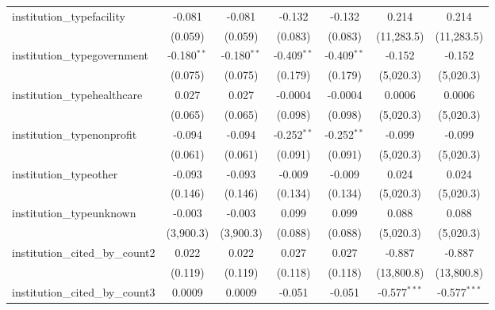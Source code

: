 \begin{tabular}{lcccccc}
   institution\_typefacility             & -0.081         & -0.081         & -0.132        & -0.132        & 0.214          & 0.214\\   
                                         & (0.059)        & (0.059)        & (0.083)       & (0.083)       & (11,283.5)     & (11,283.5)\\   
   institution\_typegovernment           & -0.180$^{**}$  & -0.180$^{**}$  & -0.409$^{**}$ & -0.409$^{**}$ & -0.152         & -0.152\\   
                                         & (0.075)        & (0.075)        & (0.179)       & (0.179)       & (5,020.3)      & (5,020.3)\\   
   institution\_typehealthcare           & 0.027          & 0.027          & -0.0004       & -0.0004       & 0.0006         & 0.0006\\   
                                         & (0.065)        & (0.065)        & (0.098)       & (0.098)       & (5,020.3)      & (5,020.3)\\   
   institution\_typenonprofit            & -0.094         & -0.094         & -0.252$^{**}$ & -0.252$^{**}$ & -0.099         & -0.099\\   
                                         & (0.061)        & (0.061)        & (0.091)       & (0.091)       & (5,020.3)      & (5,020.3)\\   
   institution\_typeother                & -0.093         & -0.093         & -0.009        & -0.009        & 0.024          & 0.024\\   
                                         & (0.146)        & (0.146)        & (0.134)       & (0.134)       & (5,020.3)      & (5,020.3)\\   
   institution\_typeunknown              & -0.003         & -0.003         & 0.099         & 0.099         & 0.088          & 0.088\\   
                                         & (3,900.3)      & (3,900.3)      & (0.088)       & (0.088)       & (5,020.3)      & (5,020.3)\\   
   institution\_cited\_by\_count2        & 0.022          & 0.022          & 0.027         & 0.027         & -0.887         & -0.887\\   
                                         & (0.119)        & (0.119)        & (0.118)       & (0.118)       & (13,800.8)     & (13,800.8)\\   
   institution\_cited\_by\_count3        & 0.0009         & 0.0009         & -0.051        & -0.051        & -0.577$^{***}$ & -0.577$^{***}$\\   

\end{tabular}
